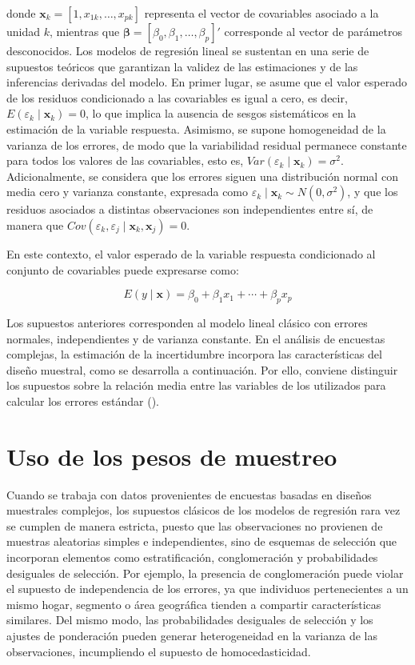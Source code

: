 \documentclass[
  spanish,
  11pt,
  letterpaper,
  oneside,
  open=any]{scrbook}
\begin{document}
donde \(\mathbf{x}_{k} = [1, x_{1k}, \ldots, x_{pk}]\) representa el
vector de covariables asociado a la unidad \(k\), mientras que
\(\boldsymbol{\beta} = [\beta_{0}, \beta_{1}, \ldots, \beta_{p}]'\)
corresponde al vector de parámetros desconocidos. Los modelos de
regresión lineal se sustentan en una serie de supuestos teóricos que
garantizan la validez de las estimaciones y de las inferencias derivadas
del modelo. En primer lugar, se asume que el valor esperado de los
residuos condicionado a las covariables es igual a cero, es decir,
\(E(\varepsilon_{k} \mid \mathbf{x}_{k}) = 0\), lo que implica la
ausencia de sesgos sistemáticos en la estimación de la variable
respuesta. Asimismo, se supone homogeneidad de la varianza de los
errores, de modo que la variabilidad residual permanece constante para
todos los valores de las covariables, esto es,
\(Var(\varepsilon_{k} \mid \mathbf{x}_{k}) = \sigma^2\). Adicionalmente,
se considera que los errores siguen una distribución normal con media
cero y varianza constante, expresada como
\(\varepsilon_{k} \mid \mathbf{x}_{k} \sim N(0,\sigma^2)\), y que los
residuos asociados a distintas observaciones son independientes entre
sí, de manera que
\(Cov(\varepsilon_{k},\varepsilon_{j}\mid \mathbf{x}_{k},\mathbf{x}_{j})=0\).

En este contexto, el valor esperado de la variable respuesta
condicionado al conjunto de covariables puede expresarse como:

\[
E(y \mid \mathbf{x}) = {\beta}_{0} + {\beta}_{1}x_{1} + \cdots + {\beta}_{p}x_{p}
\]

Los supuestos anteriores corresponden al modelo lineal clásico con
errores normales, independientes y de varianza constante. En el análisis
de encuestas complejas, la estimación de la incertidumbre incorpora las
características del diseño muestral, como se desarrolla a continuación.
Por ello, conviene distinguir los supuestos sobre la relación media
entre las variables de los utilizados para calcular los errores estándar
().

\section{Uso de los pesos de
muestreo}\label{uso-de-los-pesos-de-muestreo}

Cuando se trabaja con datos provenientes de encuestas basadas en diseños
muestrales complejos, los supuestos clásicos de los modelos de regresión
rara vez se cumplen de manera estricta, puesto que las observaciones no
provienen de muestras aleatorias simples e independientes, sino de
esquemas de selección que incorporan elementos como estratificación,
conglomeración y probabilidades desiguales de selección. Por ejemplo, la
presencia de conglomeración puede violar el supuesto de independencia de
los errores, ya que individuos pertenecientes a un mismo hogar, segmento
o área geográfica tienden a compartir características similares. Del
mismo modo, las probabilidades desiguales de selección y los ajustes de
ponderación pueden generar heterogeneidad en la varianza de las
observaciones, incumpliendo el supuesto de homocedasticidad.
\end{document}
